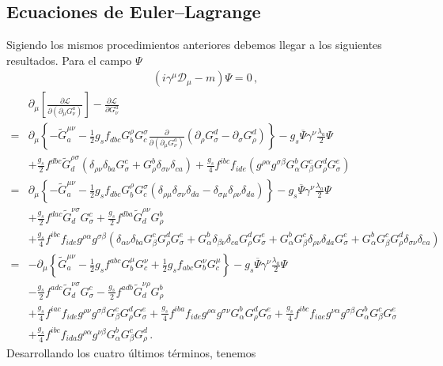 \subsection{Ecuaciones de Euler--Lagrange}
\label{sec:ecuaciones-de-euler-1}
Sigiendo los mismos procedimientos anteriores debemos llegar a los siguientes resultados. Para el campo $\Psi$
\begin{align}
  (i\gamma^\mu\mathcal{D}_\mu-m)\Psi=0\,,
\end{align}
\begin{align}
  &\partial_\mu\left[\frac{\partial\mathcal{L}}{\partial\left(\partial_\mu G_\nu^a\right)}\right]-\frac{\partial\mathcal{L}}{\partial G_\nu^a}\nonumber\\
=&\partial_\mu\left\{-  \widetilde{G}^{\mu\nu}_a-\frac{1}{2}g_s f_{dbc}G_b^\rho G^\sigma_c\frac{\partial}{\partial\left(\partial_\mu G_\nu^a\right)}
\left(\partial_\rho G_\sigma^d-\partial_\sigma G_\rho^d\right)\right\}
-g_s\overline{\Psi}\gamma^\nu\frac{\lambda_a}{2}\Psi\nonumber\\
&+\frac{g_s}{2} f^{dbc}\widetilde{G}^{\rho\sigma}_d(\delta_{\rho\nu}\delta_{ba}G^c_\sigma+G^b_\rho\delta_{\sigma\nu}\delta_{ca})
+\frac{g_s}{4}f^{ibc}f_{ide}(g^{\rho\alpha}g^{\sigma\beta}G^b_{\alpha}G^c_\beta G^d_\rho G^e_\sigma)\nonumber\\
  =&\partial_\mu\left\{- \widetilde{G}^{\mu\nu}_a-\frac{1}{2}g_s f_{dbc}G_b^\rho G^\sigma_c
\left(\delta_{\rho\mu}\delta_{\sigma\nu}\delta_{da}-\delta_{\sigma\mu}\delta_{\rho\nu}\delta_{da}\right)\right\}
-g_s\overline{\Psi}\gamma^\nu\frac{\lambda_a}{2}\Psi\nonumber\\
&+\frac{g_s}{2} f^{dac}\widetilde{G}^{\nu\sigma}_dG^c_\sigma
+\frac{g_s}{2} f^{dba}\widetilde{G}^{\rho\nu}_dG^b_\rho\nonumber\\
&+\frac{g_s}{4}f^{ibc}f_{ide}g^{\rho\alpha}g^{\sigma\beta}(\delta_{\alpha\nu}\delta_{ba}G^c_\beta G^d_\rho G^e_\sigma+G^b_{\alpha}\delta_{\beta\nu}\delta_{ca}G^d_\rho G^e_\sigma+G^b_{\alpha}G^c_\beta\delta_{\rho\nu}\delta_{da}G^e_\sigma+G^b_{\alpha}G^c_\beta G^d_\rho\delta_{\sigma\nu}\delta_{ea})\nonumber\\
  =&-\partial_\mu\left\{  \widetilde{G}^{\mu\nu}_a-\frac{1}{2}g_s f^{abc}G_b^\mu G^\nu_c
+\frac{1}{2}g_s f_{abc}G_b^\nu G^\mu_c\right\}
-g_s\overline{\Psi}\gamma^\nu\frac{\lambda_a}{2}\Psi\nonumber\\
&-\frac{g_s}{2} f^{adc}\widetilde{G}^{\nu\sigma}_dG^c_\sigma
-\frac{g_s}{2} f^{adb}\widetilde{G}^{\nu\rho}_dG^b_\rho\nonumber\\
&+\frac{g_s}{4}f^{iac}f_{ide}g^{\rho\nu}g^{\sigma\beta}G^c_\beta G^d_\rho G^e_\sigma
+\frac{g_s}{4}f^{iba}f_{ide}g^{\rho\alpha}g^{\sigma\nu}G^b_{\alpha}G^d_\rho G^e_\sigma
+\frac{g_s}{4}f^{ibc}f_{iae}g^{\nu\alpha}g^{\sigma\beta}G^b_{\alpha}G^c_\beta G^e_\sigma\nonumber\\
&+\frac{g_s}{4}f^{ibc}f_{ida}g^{\rho\alpha}g^{\nu\beta}G^b_{\alpha}G^c_\beta G^d_\rho\,.
\end{align}
Desarrollando los cuatro últimos términos, tenemos

